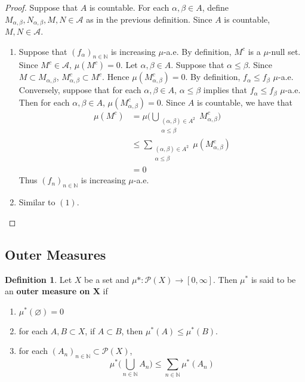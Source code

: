 \documentclass[12pt]{amsart}
\theoremstyle{definition}
\newtheorem{defn}[definition]{Definition}
\newcommand{\al}{\alpha}
\newcommand{\be}{\beta}
\newcommand{\N}{\mathbb{N}}
\newcommand{\MA}{\mathcal{A}}
\newcommand{\MP}{\mathcal{P}}
\newcommand{\ld}[1]{\label{defn:#1}}
\begin{document}
	\begin{proof} Suppose that $A$ is countable. For each $\al, \be \in A$, define $M_{\al, \be},N_{\al, \be},M,N \in \MA$ as in the previous definition. Since $A$ is countable, $M,N \in \MA$. 
		\begin{enumerate}
			\item Suppose that $(f_{\al})_{n \in \N}$ is increasing $\mu$-a.e. By definition, $M^c$ is a $\mu$-null set. Since $M^c \in \MA$, $\mu(M^c) = 0$. Let $\al, \be \in A$. Suppose that $\al \leq \be$. Since $M \subset M_{\al, \be}$, $M_{\al, \be}^c \subset M^c$. Hence $\mu(M_{\al, \be}^c) = 0$. By definition, $f_{\al} \leq f_{\be}$ $\mu$-a.e.\\
			Conversely, suppose that for each $\al, \be \in A$, $\al \leq \be$ implies that $f_{\al} \leq f_{\be}$ $\mu$-a.e. Then for each $\al, \be \in A$, $\mu(M_{\al, \be}^c) = 0$. Since $A$ is countable, we have that
			\begin{align*}
				\mu(M^c) 
				& = \mu \bigg( \bigcup\limits_{\substack{(\al, \be) \in A^2 \\ \al \leq \be}} M_{\al, \be}^c \bigg) \\
				& \leq \sum_{\substack{(\al, \be) \in A^2 \\ \al \leq \be}} \mu(M_{\al, \be}^c) \\
				& = 0
			\end{align*}
			Thus $(f_n)_{n \in \N}$ is increasing $\mu$-a.e.
			\item Similar to $(1)$.
		\end{enumerate}
	\end{proof}







	
	
	
	
	
	
	
	
	
	
	
	
	
	
	
	
	\newpage
	\subsection{Outer Measures}
	
	\begin{defn} \ld{00000} 
		Let $X$ be a set and $\mu* : \MP(X) \rightarrow [0, \infty]$. Then $\mu^*$ is said to be an \textbf{outer measure on X} if 
		\begin{enumerate}
			\item $\mu^*(\varnothing) = 0$
			\item for each $A,B \subset X $, if $A \subset B$, then $\mu^*(A) \leq \mu^*(B)$.
			\item for each $(A_n)_{n \in \N} \subset \MP(X)$, $$\mu^*\big(\bigcup\limits_{n \in \N} A_n\big) \leq \sum\limits_{n \in \N}\mu^*(A_n) $$
		\end{enumerate}
	\end{defn}
	
\end{document}
